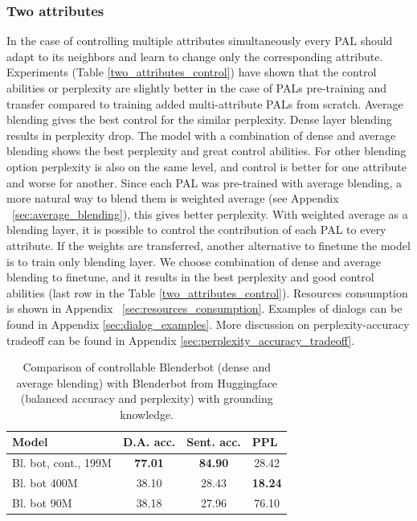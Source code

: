 \documentclass[11pt]{article}
\begin{document}
\subsubsection{Two attributes}

In the case of controlling multiple attributes simultaneously every PAL should adapt to its neighbors and  learn to change only the corresponding attribute. Experiments (Table \ref{two_attributes_control}) have shown that the control abilities or perplexity are slightly better in the case of PALs pre-training and transfer compared to training added multi-attribute PALs from scratch. Average blending gives the best control for the similar perplexity. Dense layer blending results in perplexity drop. The model with a combination of dense and average blending shows the best perplexity and great control abilities.
For other blending option perplexity is also on the same level, and control is better for one attribute and worse for another. Since each PAL was pre-trained with average blending, a more natural way to blend them is weighted average (see Appendix ~\ref{sec:average_blending}), this gives better perplexity. With weighted average as a blending layer, it is possible to control the contribution of each PAL to every attribute. 
If the weights are transferred, another alternative to finetune the model is to train only blending layer. We choose combination of dense and average blending to finetune, and it results in the best perplexity and good control abilities (last row in the Table \ref{two_attributes_control}). Resources consumption is shown in Appendix ~\ref{sec:resources_consumption}. Examples of dialogs can be found in Appendix \ref{sec:dialog_examples}. More discussion on perplexity-accuracy tradeoff can be found in Appendix \ref{sec:perplexity_accuracy_tradeoff}.

\begin{table}[ht]
\fontsize{9}{11}
\selectfont 
\centering
\begin{tabular}{lccc}
\hline
Model                         & D.A. acc. & Sent. acc. & \multicolumn{1}{l}{PPL} \\ \hline
Bl. bot, cont., 199M      & \textbf{77.01}                 & \textbf{84.90}               & 28.42                               \\
Bl. bot 400M & 38.10                 & 28.43               & \textbf{18.24}                                \\
Bl. bot 90M  & 38.18                 & 27.96               & 76.10                              \\ \hline
\end{tabular}
\caption{Comparison of controllable Blenderbot (dense and average blending) with Blenderbot from Huggingface (balanced accuracy and perplexity) with grounding knowledge.}
\label{blenderbot_cont_and_baselines}
\end{table}
\end{document}
